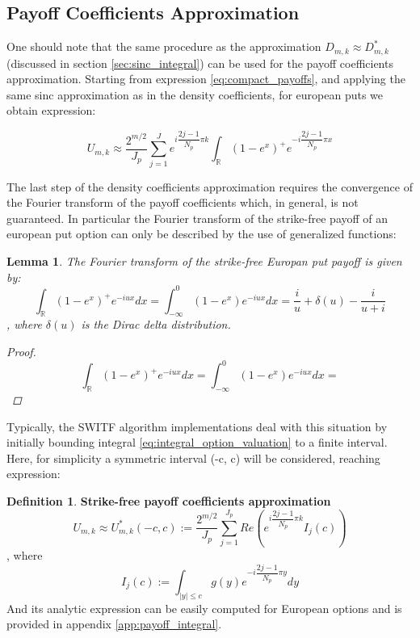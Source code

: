\documentclass[12,twoside]{mammeTFM}
\newtheorem{lem}[thm]{Lemma}
\theoremstyle{definition}
\newtheorem{definition}[thm]{Definition}
\theoremstyle{remark}
\newcommand{\R}{\ensuremath{\mathbb{R}}}
\begin{document}
\subsection{Payoff Coefficients Approximation} \label{subsec:payoff_coefficients}
One should note that the same procedure as the approximation $D_{m,k} \approx D_{m,k}^{*}$ (discussed in section \ref{sec:sinc_integral}) can be used for the payoff coefficients approximation. Starting from expression \ref{eq:compact_payoffs}, and applying the same sinc approximation as in the density coefficients, for european puts we obtain expression:

\begin{equation}
U_{m,k} \approx \dfrac{2^{m/2}}{J_p}\sum_{j=1}^{J} e^{i \dfrac{2j - 1}{N_p} \pi k} \int_{\R} (1 - e^x)^{+} e^{-i \dfrac{2j - 1}{N_p} \pi x}
\end{equation}

The last step of the density coefficients approximation requires the convergence of the Fourier transform of the payoff coefficients which, in general, is not guaranteed. In particular the Fourier transform of the strike-free payoff of an european put option can only be described by the use of generalized functions:
\begin{lem} The Fourier transform of the strike-free Europan put payoff is given by:
\begin{equation}
\int_{\R} (1 - e^x)^{+} e^{- i u x} dx = \int_{-\infty}^{0} (1 - e^x) e^{- i u x} dx = \dfrac{i}{u} + \delta(u) - \dfrac{i}{u + i}
\end{equation}
, where $\delta(u)$ is the Dirac delta distribution.
\begin{proof}

\begin{equation}
\int_{\R} (1 - e^x)^{+} e^{- i u x} dx = \int_{-\infty}^{0} (1 - e^x) e^{- i u x} dx = 
\end{equation}
\end{proof}
\end{lem}

Typically, the SWITF algorithm implementations deal with this situation by initially bounding integral \ref{eq:integral_option_valuation} to a finite interval. Here, for simplicity a symmetric interval (-c, c) will be considered, reaching expression:

\begin{definition} \textbf{Strike-free payoff coefficients approximation}
\begin{equation}
U_{m,k} \approx U_{m,k}^{*}(-c, c) := \dfrac{2^{m/2}}{J_p}\sum_{j=1}^{J_p} Re \left(e^{i \dfrac{2j - 1}{N_p} \pi k} I_{j}(c)\right)
\end{equation}
, where
\begin{equation}
I_{j}(c) := \int_{|y| \leq c} g(y) e^{-i \dfrac{2j - 1}{N_p} \pi y} dy
\end{equation}
And its analytic expression can be easily computed for European options and is provided in appendix \ref{app:payoff_integral}.
\end{definition}
\end{document}
